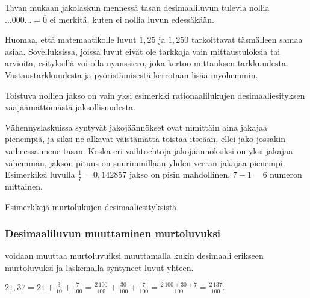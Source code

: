 Tavan mukaan jakolaskun mennessä tasan desimaaliluvun tulevia nollia $\ldots000\ldots=\overline{0}$ ei merkitä, kuten ei nollia luvun edessäkään.

\begin{esimerkki}
\end{esimerkki}

Huomaa, että matemaatikolle luvut $1,25$ ja $1,250$ tarkoittavat täsmälleen samaa asiaa. Sovelluksissa, joissa luvut eivät ole tarkkoja vain mittaustuloksia tai arvioita, esityksillä voi olla nyanssiero, joka kertoo mittauksen tarkkuudesta. Vastaustarkkuudesta ja pyöristämisestä kerrotaan lisää myöhemmin. %

Toistuva nollien jakso on vain yksi esimerkki rationaalilukujen desimaaliesityksen vääjäämättömästä jaksollisuudesta.


Vähennyslaskuissa syntyvät jakojäännökset ovat nimittäin aina jakajaa pienempiä, ja siksi ne alkavat väistämättä toistaa itseään, ellei jako jossakin vaiheessa mene tasan. Koska eri vaihtoehtoja jakojäännöksiksi on yksi jakajaa vähemmän, jakson pituus on suurimmillaan yhden verran jakajaa pienempi. Esimerkiksi luvulla $\frac{1}{7}=0,\overline{142857}$ jakso on pisin mahdollinen, $7-1=6$ numeron mittainen.

\begin{esimerkki}
Esimerkkejä murtolukujen desimaaliesityksistä
\end{esimerkki}


\subsubsection*{Desimaaliluvun muuttaminen murtoluvuksi}

 voidaan muuttaa murtoluvuiksi muuttamalla kukin desimaali erikseen murtoluvuksi ja laskemalla syntyneet luvut yhteen.

\begin{esimerkki}
$21,37 = 21+ \frac{3}{10}+\frac{7}{100} =
\frac{2\,100}{100}+\frac{30}{100}+\frac{7}{100}
 = \frac{2\,100+30+7}{100} = \frac{2\,137}{100}.$
\end{esimerkki}

